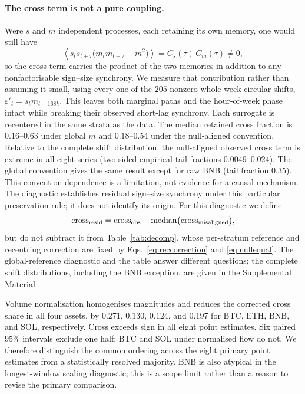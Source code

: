\documentclass[aps,pre,twocolumn,superscriptaddress,floatfix,nofootinbib]{revtex4-2}
\newcommand{\eps}{\varepsilon}
\newcommand{\avg}[1]{\left\langle #1 \right\rangle}
\begin{document}
\paragraph*{The cross term is not a pure coupling.}
Were $s$ and $m$ independent processes, each retaining its own memory, one would
still have
\begin{equation}
  \avg{s_t s_{t+\tau}\bigl(m_t m_{t+\tau}-\bar m^2\bigr)}
  =C_s(\tau)\,C_m(\tau)\neq0 ,
  \label{eq:crosscontam}
\end{equation}
so the cross term carries the product of the two memories in addition to any
nonfactorisable sign--size synchrony. We measure that contribution rather than
assuming it small, using every one of the $205$ nonzero whole-week circular
shifts, $\eps'_t=s_t m_{t+168k}$. This leaves both marginal paths and the
hour-of-week phase intact while breaking their observed short-lag synchrony.
Each surrogate is recentered in the same strata as the data. The median
retained cross fraction is $0.16$--$0.63$ under global $\bar m$ and
$0.18$--$0.54$ under the null-aligned convention. Relative to the complete
shift distribution, the null-aligned observed cross term is extreme in all
eight series (two-sided empirical tail fractions $0.0049$--$0.024$). The
global convention gives the same result except for raw BNB (tail fraction
$0.35$). This convention dependence is a limitation, not evidence for a
causal mechanism. The diagnostic establishes residual sign--size synchrony
under this particular preservation rule; it does not identify its origin. For
this diagnostic we define
\begin{equation}
  {\rm cross}_{\rm resid}={\rm cross}_{\rm obs}
    -\operatorname{median}\bigl({\rm cross}_{\rm misaligned}\bigr) ,
  \label{eq:crosscorr}
\end{equation}
but do not subtract it from Table~\ref{tab:decomp}, whose per-stratum reference
and recentring correction are fixed by Eqs.~\eqref{eq:reccorrection} and
\eqref{eq:nullequal}. The global-reference diagnostic and the table answer
different questions; the complete shift distributions, including the BNB
exception, are given
in the Supplemental Material \cite{supplement}.

Volume normalisation homogenises magnitudes and reduces the corrected cross
share in all four assets, by $0.271$, $0.130$, $0.124$, and $0.197$ for BTC,
ETH, BNB, and SOL, respectively. Cross exceeds sign in all eight point
  estimates. Six paired $95\%$ intervals exclude one half; BTC and SOL under
  normalised flow do not. We therefore distinguish the common ordering across
  the eight primary point estimates from a statistically resolved majority. BNB
  is also atypical in the longest-window scaling diagnostic; this is a scope
  limit rather than a reason to revise the primary comparison.
\end{document}
